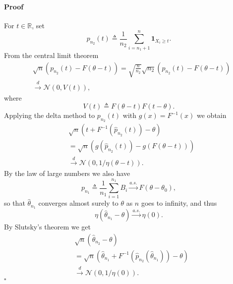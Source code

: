 \documentclass[letterpaper, 11pt]{IEEEtran}      %
\newenvironment{proof}{\paragraph*{Proof}}{\hfill$\square$ \newline}
\newcommand{\Ncal}{\mathcal{N}}
\begin{document}
\begin{proof}
For $t\in \mathbb R$, set
\[
p_{n_2}(t) \triangleq \frac{1}{n_2} \sum_{i=n_1+1}^{n} \mathbf 1_{X_i \geq t}. 
\]
From the central limit theorem
\begin{align*}
& \sqrt{n} \left( p_{n_2}(t) - F( \theta - t) \right)  = \sqrt{\frac{n}{n_2}} \sqrt{n_2} \left(  p_{n_2}(t) - F(\theta - t) \right) \\
& \overset{d}{\rightarrow} \Ncal\left( 0, V(t) \right),
\end{align*}
where
\[
V(t) \triangleq F(\theta - t) F \left( t - \theta\right). 
\]
Applying the delta method to $p_{n_2}(t)$ with $g(x) = F^{-1}(x)$ we obtain
\begin{align*}
& \sqrt{n} \left( t + F^{-1}(\hat{p}_{n_2}(t)) - \theta \right) \\
&= \sqrt{n} \left( g(\hat{p}_{n_2}(t)) - g \left(F(\theta-t) \right)  \right) \\
& \overset{d}{\to} \Ncal\left(0, 
1/\eta(\theta-t) \right).
\end{align*}
By the law of large numbers we also have
\[
p_{n_1} \triangleq \frac{1}{n_1} \sum_{i=1}^{n_1} B_i \overset{a.s.}{\rightarrow} F(\theta - \theta_0),
\]
so that $\hat{\theta}_{n_1}$ converges almost surely to $\theta$ as $n$ goes to infinity, and thus 
\[
\eta( \hat{\theta}_{n_1}-\theta) \overset{a.s.}{\rightarrow} \eta(0). 
\]
By Slutsky's theorem we get
\begin{align*}
& \sqrt{n}\left(\hat{\theta}_{n_2} - \theta\right) \\
& = \sqrt{n} \left( \hat{\theta}_{n_1} + F^{-1}(\hat{p}_{n_2}(\hat{\theta}_{n_1})) - \theta \right)  \\
& \overset{d}{\to} \Ncal\left( 0, 
1/\eta(0) \right). 
\end{align*}
\end{proof}
%
\end{document}

